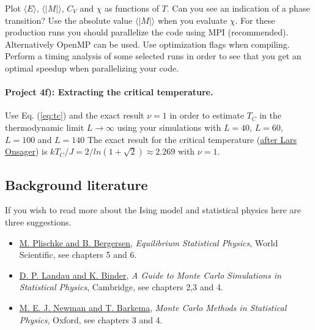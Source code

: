 \documentclass[10pt,showpacs,preprintnumbers,footinbib,amsmath,amssymb,aps,prl,twocolumn,groupedaddress,superscriptaddress,showkeys]{revtex4-1}
\begin{document}
Plot $\langle E\rangle$,
$\langle \vert M\vert\rangle$, $C_V$ and $\chi$ as functions of $T$. Can
you see an indication of a phase transition?  Use the absolute value
$\langle \vert M\vert\rangle$ when you evaluate $\chi$.  For these production runs you should
parallelize the code using MPI (recommended). Alternatively OpenMP can be used. Use optimization flags when compiling. Perform a timing analysis of some selected runs in order to see that you get an optimal speedup when parallelizing your code. 



\paragraph{Project 4f): Extracting the critical temperature.}
Use Eq. (\ref{eq:tc}) and the exact result
$\nu=1$ in order to estimate $T_C$ in the thermodynamic limit 
$L\rightarrow \infty$
using your simulations with $L=40$, $L=60$, $L=100$ and $L=140$
The exact result for the critical temperature (\href{{http://journals.aps.org/pr/abstract/10.1103/PhysRev.65.117}}{after Lars Onsager}) is
$kT_C/J=2/ln(1+\sqrt{2})\approx 2.269$ with $\nu=1$.

\subsection*{Background literature}

If you wish to read more about the Ising model and statistical physics here are three suggestions.

\begin{itemize}
  \item \href{{http://www.worldscientific.com/worldscibooks/10.1142/5660}}{M. Plischke and B. Bergersen}, \emph{Equilibrium Statistical Physics}, World Scientific, see chapters 5 and 6.

  \item \href{{http://www.cambridge.org/no/academic/subjects/physics/computational-science-and-modelling/guide-monte-carlo-simulations-statistical-physics-4th-edition?format=HB}}{D. P. Landau and K. Binder}, \emph{A Guide to Monte Carlo Simulations in Statistical Physics}, Cambridge, see chapters 2,3 and 4.

  \item \href{{https://global.oup.com/academic/product/monte-carlo-methods-in-statistical-physics-9780198517979?cc=no&lang=en&}}{M. E. J. Newman and T. Barkema}, \emph{Monte Carlo Methods in Statistical Physics}, Oxford, see chapters 3 and 4.
\end{itemize}
\end{document}
